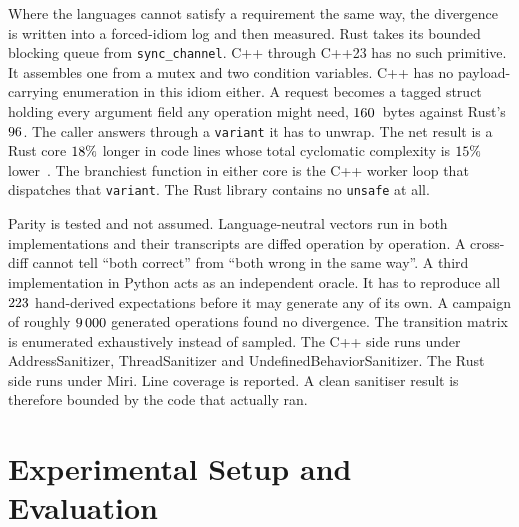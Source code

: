 \documentclass[english,twoside,openright,a4paper,censored,csm,software-track-2020]{HYthesisML}
\begin{document}
Where the languages cannot satisfy a requirement the same way, the divergence is written
into a forced-idiom log and then measured. Rust takes its bounded blocking queue from
\texttt{sync\_channel}. C++ through C++23 has no such primitive. It assembles one from a
mutex and two condition variables. C++ has no payload-carrying enumeration in this idiom
either. A request becomes a tagged struct holding every argument field any operation might
need, $160$~bytes against Rust's $96$. The caller answers
through a \texttt{variant} it has to unwrap. The net result is a Rust core
$18\%$ longer in code lines whose total cyclomatic complexity is
$15\%$ lower~\cite{lizard}. The branchiest function in either core is the C++
worker loop that dispatches that \texttt{variant}. The Rust library contains no
\texttt{unsafe} at all.

Parity is tested and not assumed. Language-neutral vectors run in both implementations
and their transcripts are diffed operation by operation. A cross-diff cannot tell
``both correct'' from ``both wrong in the same way''. A third implementation in Python
acts as an independent oracle. It has to reproduce all $223$ hand-derived
expectations before it may generate any of its own. A campaign of roughly $9\,000$
generated operations found no divergence. The transition matrix is enumerated
exhaustively instead of sampled. The C++ side runs under AddressSanitizer,
ThreadSanitizer and UndefinedBehaviorSanitizer. The Rust side runs under Miri. Line
coverage is reported. A clean sanitiser result is therefore bounded by the code that
actually ran.

\chapter{Experimental Setup and Evaluation\label{chapter:eval}}
\end{document}

